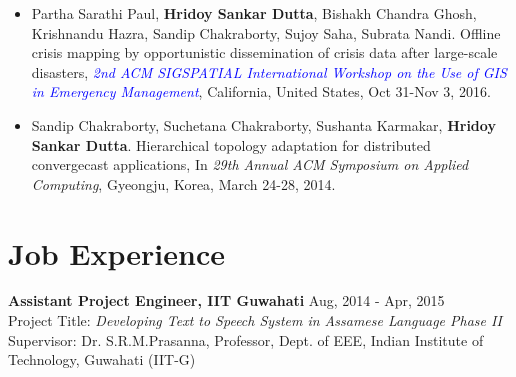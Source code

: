 \documentclass[margin, centered]{res}
\begin{document}
\begin{resume}
\begin{itemize}[leftmargin=*]
\item Partha Sarathi Paul, \textbf{Hridoy Sankar Dutta}, Bishakh Chandra Ghosh, Krishnandu Hazra, Sandip Chakraborty, Sujoy Saha, Subrata Nandi. Offline crisis mapping by opportunistic dissemination of crisis data after large-scale disasters, \textit{\textcolor{blue}{2nd ACM SIGSPATIAL International Workshop on the Use of GIS in Emergency Management}}, California, United States, Oct 31-Nov 3, 2016.

\item Sandip Chakraborty, Suchetana Chakraborty, Sushanta Karmakar, \textbf{Hridoy Sankar Dutta}. Hierarchical topology adaptation for distributed convergecast applications, In \textit{29th Annual ACM Symposium on Applied Computing}, Gyeongju, Korea, March 24-28, 2014.
\end{itemize}

\section{Job Experience}
\textbf{Assistant Project Engineer, IIT Guwahati} \hfill Aug, 2014 - Apr, 2015 \\
Project Title: \textit{Developing Text to Speech System in Assamese Language Phase II} \\
Supervisor: Dr. S.R.M.Prasanna, Professor, Dept. of EEE, Indian Institute of Technology, Guwahati (IIT-G)

\end{resume}
\end{document}
